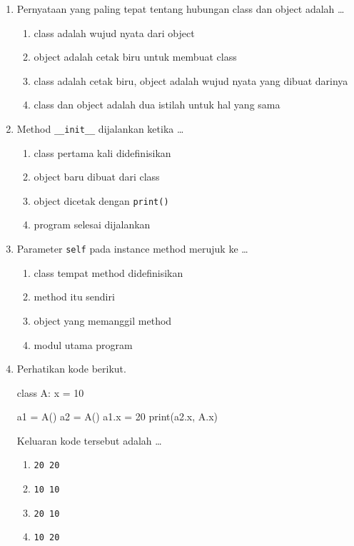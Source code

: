 \begin{enumerate}
  \item Pernyataan yang paling tepat tentang hubungan class dan object adalah \ldots
  \begin{enumerate}[label=\alph*.,itemsep=0pt]
    \item class adalah wujud nyata dari object
    \item object adalah cetak biru untuk membuat class
    \item class adalah cetak biru, object adalah wujud nyata yang dibuat darinya
    \item class dan object adalah dua istilah untuk hal yang sama
  \end{enumerate}

  \item Method \texttt{\_\_init\_\_} dijalankan ketika \ldots
  \begin{enumerate}[label=\alph*.,itemsep=0pt]
    \item class pertama kali didefinisikan
    \item object baru dibuat dari class
    \item object dicetak dengan \texttt{print()}
    \item program selesai dijalankan
  \end{enumerate}

  \item Parameter \texttt{self} pada instance method merujuk ke \ldots
  \begin{enumerate}[label=\alph*.,itemsep=0pt]
    \item class tempat method didefinisikan
    \item method itu sendiri
    \item object yang memanggil method
    \item modul utama program
  \end{enumerate}

  \item Perhatikan kode berikut.
\begin{kode}[Soal 4]
class A:
    x = 10

a1 = A()
a2 = A()
a1.x = 20
print(a2.x, A.x)
\end{kode}
  Keluaran kode tersebut adalah \ldots
  \begin{enumerate}[label=\alph*.,itemsep=0pt]
    \item \texttt{20 20}
    \item \texttt{10 10}
    \item \texttt{20 10}
    \item \texttt{10 20}
  \end{enumerate}


\end{enumerate}

